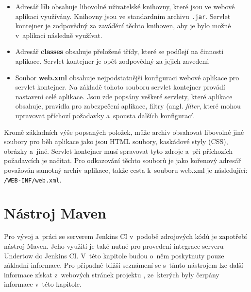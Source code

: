             \begin{itemize}
                \item Adresář \textbf{lib} obsahuje libovolné uživatelské knihovny, které jsou ve webové aplikaci využívány. 
                    Knihovny jsou ve standardním archivu \texttt{.jar}.
                    Servlet kontejner je zodpovědný za zavádění těchto knihoven, aby je bylo možné v~aplikaci následně využívat.

                \item Adresář \textbf{classes} obsahuje přeložené třídy, které se podílejí na činnosti aplikace. 
                    Servlet kontejner je opět zodpovědný za jejich zavedení. 

                \item Soubor \textbf{web.xml} obsahuje nejpodstatnější konfiguraci webové aplikace pro servlet kontejner.
                    Na základě tohoto souboru servlet kontejner provádí nastavení celé aplikace.
                    Jsou zde popsány veškeré servlety, které aplikace obsahuje, pravidla pro zabezpečení aplikace,
                    filtry (angl. \emph{filter}, které mohou upravovat příchozí požadavky a~spousta dalších konfigurací. 
            \end{itemize}

            Kromě základních výše popsaných položek, může archiv obsahovat libovolné jiné soubory pro běh aplikace jako jsou 
            HTML soubory, kaskádové styly (CSS), obrázky a~jiné. Servlet kontejner musí spravovat tyto zdroje
            a~při příchozích požadavcích je načítat. Pro odkazování těchto souborů je jako kořenový adresář považován
            samotný archiv aplikace, takže cesta k~souboru web.xml je následující: \texttt{/WEB-INF/web.xml}.

            
         
    \section{Nástroj Maven} \label{maven}
        Pro vývoj a~práci se serverem Jenkins CI v~podobě zdrojových kódů je zapotřebí nástroj Maven. 
        Jeho využití je také nutné pro provedení integrace serveru Undertow do Jenkins CI. 
        V~této kapitole budou o~něm poskytnuty pouze základní informace. Pro případné bližší
        seznámení se s~tímto nástrojem lze další informace získat z~webových stránek projektu \cite{mavenWeb},
        ze~kterých byly čerpány informace v~této kapitole. 
        
